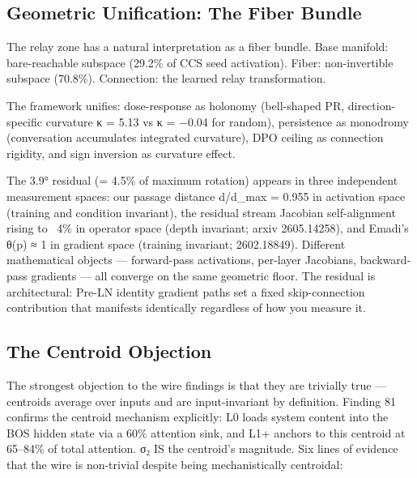 \documentclass[12pt]{article}
\begin{document}
\subsection{Geometric Unification: The Fiber Bundle}

The relay zone has a natural interpretation as a fiber bundle. Base manifold: bare-reachable subspace (29.2\% of CCS seed activation). Fiber: non-invertible subspace (70.8\%). Connection: the learned relay transformation.

The framework unifies: dose-response as holonomy (bell-shaped PR, direction-specific curvature κ = 5.13 vs κ = −0.04 for random), persistence as monodromy (conversation accumulates integrated curvature), DPO ceiling as connection rigidity, and sign inversion as curvature effect.

The 3.9° residual (= 4.5\% of maximum rotation) appears in three independent measurement spaces: our passage distance d/d\_max = 0.955 in activation space (training and condition invariant), the residual stream Jacobian self-alignment rising to ~4\% in operator space (depth invariant; arxiv 2605.14258), and Emadi's θ(p) ≈ 1 in gradient space (training invariant; 2602.18849). Different mathematical objects — forward-pass activations, per-layer Jacobians, backward-pass gradients — all converge on the same geometric floor. The residual is architectural: Pre-LN identity gradient paths set a fixed skip-connection contribution that manifests identically regardless of how you measure it.

\subsection{The Centroid Objection}

The strongest objection to the wire findings is that they are trivially true — centroids average over inputs and are input-invariant by definition. Finding 81 confirms the centroid mechanism explicitly: L0 loads system content into the BOS hidden state via a 60\% attention sink, and L1+ anchors to this centroid at 65–84\% of total attention. σ₂ IS the centroid's magnitude. Six lines of evidence that the wire is non-trivial despite being mechanistically centroidal:
\end{document}
